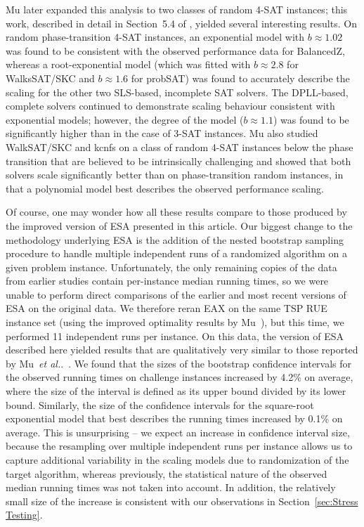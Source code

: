 \documentclass[aic]{iosart2x}
\newcommand{\etal}{\emph{et al.}}
\begin{document}
Mu later expanded this analysis to two classes of random 4-SAT instances; this work, described in detail in Section~5.4 of \cite{Mu15}, yielded several interesting results. 
On random phase-transition 4-SAT instances, an exponential model with $b \approx  1.02$ was found to be consistent with the observed performance data for BalancedZ, whereas a root-exponential model (which was fitted with $b \approx 2.8$ for WalksSAT/SKC and $b \approx  1.6$ for probSAT) was found to accurately describe the scaling for the other two SLS-based, incomplete SAT solvers. 
The DPLL-based, complete solvers continued to demonstrate scaling behaviour consistent with exponential models; however, the degree of the model ($b \approx 1.1$) was found to be significantly higher than in the case of 3-SAT instances. 
Mu also studied WalkSAT/SKC and kcnfs on a class of random 4-SAT instances below the phase transition that are believed to be intrinsically challenging and showed that both solvers scale significantly better than on phase-transition random instances, in that a polynomial model best describes the observed performance scaling.

Of course, one may wonder how all these results compare to those produced by the improved version of ESA presented in this article.
Our biggest change to the methodology underlying ESA is the addition of the nested bootstrap sampling procedure to handle multiple independent runs of a randomized algorithm on a given problem instance. 
Unfortunately, the only remaining copies of the data from earlier studies contain per-instance median running times, so we were unable to perform direct comparisons of the earlier and most recent versions of ESA on the original data. We therefore reran EAX on the same TSP RUE instance set (using the improved optimality results by Mu~\cite{Mu15}), but this time, we performed 11 independent runs per instance.
On this data, the version of ESA described here yielded results that are qualitatively very similar to those reported by Mu~\etal{}.~\cite{MuEtAl16}. 
We found that the sizes of the bootstrap confidence intervals for the observed running times on challenge instances increased by 4.2\% on average, where the size of the interval is defined as its upper bound divided by its lower bound. Similarly, the size of the confidence intervals for the square-root exponential model that best describes the running times increased by 0.1\% on average. 
This is unsurprising -- we expect an increase in confidence interval size, because the resampling over multiple independent runs per instance allows us to capture additional variability in the scaling models due to randomization of the target algorithm, whereas previously, the statistical nature of the observed median running times was not taken into account. In addition, the relatively small size of the increase is consistent with our observations in Section~\ref{sec:Stress Testing}.
\end{document}

